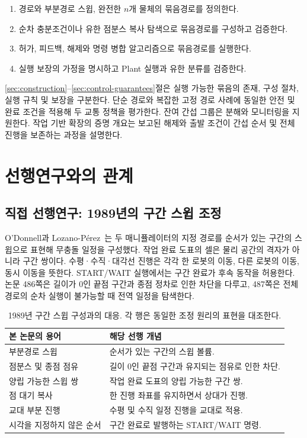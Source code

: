 \documentclass[11pt,a4paper]{article}
\theoremstyle{remark}
\begin{document}
\begin{enumerate}
\item 경로와 부분경로 스윕, 완전한 $n$개 물체의 묶음경로를 정의한다.
\item 순차 충분조건이나 유한 점분스 복사 탐색으로 묶음경로를 구성하고 검증한다.
\item 허가, 피드백, 해제와 명령 병합 알고리즘으로 묶음경로를 실행한다.
\item 실행 보장의 가정을 명시하고 Plant 실행과 유한 분류를 검증한다.
\end{enumerate}
\ref{sec:construction}--\ref{sec:control-guarantees}절은 실행 가능한 묶음의 존재, 구성 절차, 실행 규칙 및 보장을 구분한다. 단순 경로와 복잡한 고정 경로 사례에 동일한 안전 및 완료 조건을 적용해 두 교통 정책을 평가한다. 잔여 간섭 그룹은 분해와 모니터링을 지원한다. 작업 기반 확장의 증명 개요는 보고된 해제와 출발 조건이 간섭 순서 및 전체 진행을 보존하는 과정을 설명한다.

\section{선행연구와의 관계}
\label{sec:prior-art}
\subsection{직접 선행연구: 1989년의 구간 스윕 조정}
O'Donnell과 Lozano-P\'erez~\cite{odonnell1989}는 두 매니퓰레이터의 지정 경로를 순서가 있는 구간의 스윕으로 표현해 무충돌 일정을 구성했다. 작업 완료 도표의 셀은 물리 공간의 격자가 아니라 구간 쌍이다. 수평·수직·대각선 진행은 각각 한 로봇의 이동, 다른 로봇의 이동, 동시 이동을 뜻한다. START/WAIT 실행에서는 구간 완료가 후속 동작을 허용한다. 논문 486쪽은 길이가 0인 끝점 구간과 종점 정차로 인한 차단을 다루고, 487쪽은 전체 경로의 순차 실행이 불가능할 때 전역 일정을 탐색한다.
\begin{table}[htbp]
\centering\small
\caption{1989년 구간 스윕 구성과의 대응. 각 행은 동일한 조정 원리의 표현을 대조한다.}
\label{tab:1989-correspondence}
\begin{tabular}{p{.29\linewidth}p{.62\linewidth}}
\toprule
본 논문의 용어 & 해당 선행 개념~\cite{odonnell1989}\\\midrule
부분경로 스윕 & 순서가 있는 구간의 스윕 볼륨.\\[3pt]
점분스 및 종점 점유 & 길이 0인 끝점 구간과 유지되는 점유로 인한 차단.\\[3pt]
양립 가능한 스윕 쌍 & 작업 완료 도표의 양립 가능한 구간 쌍.\\[3pt]
점 대기 복사 & 한 진행 좌표를 유지하면서 상대가 진행.\\[3pt]
교대 부분 진행 & 수평 및 수직 일정 진행을 교대로 적용.\\[3pt]
시각을 지정하지 않은 순서 & 구간 완료로 발행하는 START/WAIT 명령.\\
\bottomrule
\end{tabular}
\end{table}
\end{document}

